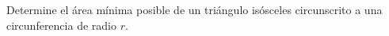 \item Determine el área mínima posible de un triángulo isósceles circunscrito a una circunferencia de radio $r$.
